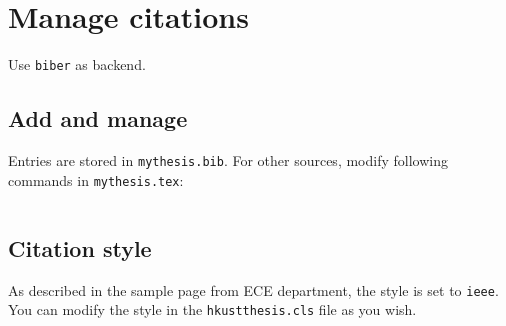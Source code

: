\section{Manage citations}
\label{chap:bibliography}

Use \lstinline|biber| as  backend.

\subsection{Add and manage}

Entries are stored in \lstinline|mythesis.bib|. For other sources, modify following commands in \lstinline|mythesis.tex|:
\begin{lstlisting}[language=TeX]

\end{lstlisting}

\subsection{Citation style}

As described in the sample page from ECE department, the style is set to \lstinline|ieee|. You can modify the style in the \lstinline|hkustthesis.cls| file as you wish.
